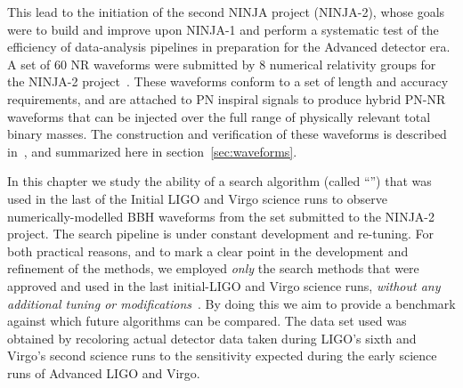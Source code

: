 This lead to the initiation of the second NINJA project (NINJA-2), whose goals 
were to build and improve upon NINJA-1 and perform a systematic test of the 
efficiency of data-analysis pipelines in preparation for the Advanced detector 
era. A set of 60 NR waveforms were submitted by 8 numerical relativity groups 
for the NINJA-2 project~\cite{Ajith:2012az}. These waveforms conform 
to a set of length and accuracy requirements, and
are attached to PN inspiral signals to produce hybrid PN-NR waveforms that can 
be injected over the full range of physically relevant total binary masses.
The construction and verification of these waveforms is described 
in~\cite{Ajith:2012az}, and summarized here in 
section~\ref{sec:waveforms}.

In this chapter we study the ability of a search algorithm (called 
``\ihope{}'') that was 
used in the last of the Initial LIGO and Virgo science runs to observe
numerically-modelled BBH waveforms from the set %
submitted to the NINJA-2 project. 
% 
The \ihope{} search pipeline is under constant development and re-tuning.
For both practical reasons, and to mark a clear point in the
development and refinement of the methods, we employed \emph{only} the
search methods that were approved and used in the
last initial-LIGO and Virgo science runs, \emph{without any additional tuning
or 
modifications}~\cite{Babak:2012zx,Aasi:2012rja,Abadie:2012rq}. 
By doing this we aim to provide a benchmark against which
future algorithms can be compared.
The data set used was obtained by recoloring actual detector data 
taken during LIGO's sixth and Virgo's second science runs to 
the sensitivity expected during the early science runs of Advanced LIGO
and Virgo.


